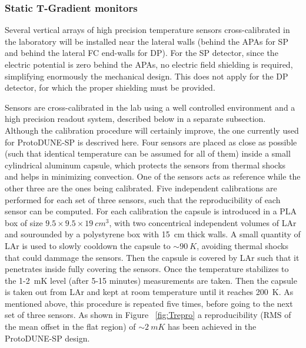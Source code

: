 
\subsubsection{Static T-Gradient monitors}

Several vertical arrays of high precision temperature sensors cross-calibrated in the laboratory will be installed near the lateral walls
(behind the APAs for SP and behind the lateral FC end-walls for DP). 
For the SP detector, since the electric potential is zero behind the APAs, no electric field shielding is required, simplifying enormously the mechanical design.
This does not apply for the DP detector, for which the proper shielding must be provided. 


Sensors are cross-calibrated in the lab using a well controlled environment and a high precision readout system, described below in a separate subsection.
Although the calibration procedure will certainly improve, the one currently used for ProtoDUNE-SP is descrived here.
Four sensors are placed as close as possible (such that identical temperature can be assumed for all of them) inside a small cylindrical aluminum capsule,
which protects the sensors from thermal shocks and helps in minimizing convection.
One of the sensors acts as reference while the other three are the ones being calibrated. Five independent calibrations
are performed for each set of three sensors, such that the reproducibility of each sensor can be computed. For each calibration 
the capsule is introduced in a PLA box of size \(9.5\times9.5\times\SI{19}{cm^3}\), with two concentrical independent volumes of LAr
and sourounded by a polystyrene box with \SI{15}{cm} thick walls. A small quantity of LAr is used to slowly
cooldown the capsule to $\sim\SI{90}{K}$, avoiding thermal shocks that could dammage the sensors.
Then the capsule is covered by LAr such that it penetrates
inside fully covering the sensors. Once the temperature stabilizes to the 1-\SI{2}{mK} level (after 5-15 minutes) measurements are taken. Then the capsule is taken out from LAr
and kept at room temperature until it reaches \SI{200}{K}. As mentioned above, this procedure is repeated five times, before going to the next set of three sensors.  
As shown in Figure ~\ref{fig:Trepro} a reproducibility (RMS of the mean offset in the flat region) of $\sim \SI{2}{mK}$ has been achieved in the ProtoDUNE-SP design.  

